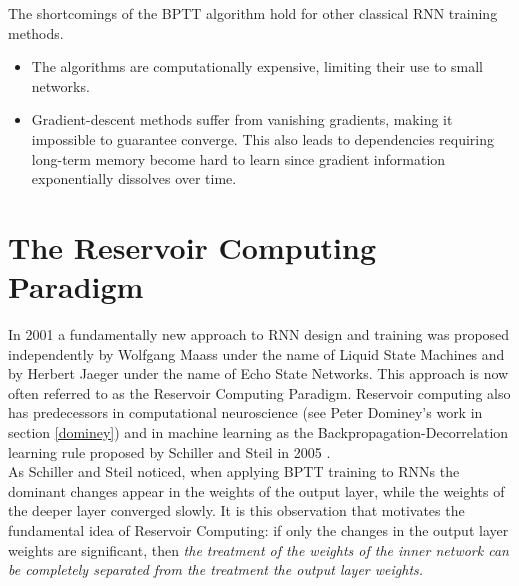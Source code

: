 \documentclass[12pt,oneside]{CUNY_CS_PhD}
\begin{document}
The shortcomings of the BPTT algorithm hold for other classical RNN training methods.
\vspace{-1.7mm} %
\begin{itemize}[noitemsep]
\item The algorithms are computationally expensive, limiting their use to small networks.
\item Gradient-descent methods suffer from vanishing gradients, making it impossible to guarantee converge. This also leads to dependencies requiring long-term memory become hard to learn since gradient information exponentially dissolves over time.
\end{itemize}


\chapter{The Reservoir Computing Paradigm}
In 2001 a fundamentally new approach to RNN design and training was proposed independently by Wolfgang Maass under the name of Liquid State Machines and by Herbert Jaeger under the name of Echo State Networks. This approach is now often referred to as the Reservoir Computing Paradigm. Reservoir computing also has predecessors in computational neuroscience (see Peter Dominey's work in section \ref{dominey}) and in machine learning as the Backpropagation-Decorrelation learning rule proposed by Schiller and Steil in 2005 \cite{steil2004backpropagation}.\\
As Schiller and Steil noticed, when applying BPTT training to RNNs the dominant changes appear in the weights of the output layer, while the weights of the deeper layer converged slowly. It is this observation that  motivates the fundamental idea of Reservoir Computing: if only the changes in the output layer weights are significant, then {\itshape the treatment of the weights of the inner network can be completely separated from the treatment the output layer weights.}
\end{document}
